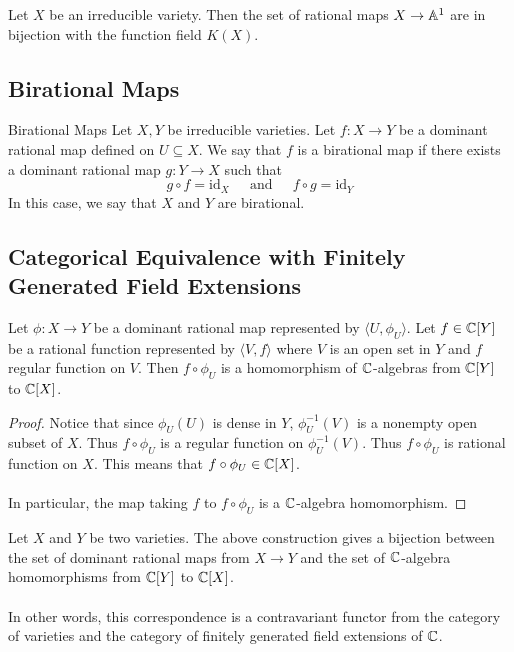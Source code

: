 \documentclass[a4paper]{article}
\begin{document}
\begin{prp}{}{} Let $X$ be an irreducible variety. Then the set of rational maps $X\to\mathbb{A}^1$ are in bijection with the function field $K(X)$. 
\end{prp}

\subsection{Birational Maps}
\begin{defn}{Birational Maps}{} Let $X,Y$ be irreducible varieties. Let $f:X\to Y$ be a dominant rational map defined on $U\subseteq X$. We say that $f$ is a birational map if there exists a dominant rational map $g:Y\to X$ such that $$g\circ f=\text{id}_X\;\;\;\;\text{ and }\;\;\;\;f\circ g=\text{id}_Y$$ In this case, we say that $X$ and $Y$ are birational. 
\end{defn}

\subsection{Categorical Equivalence with Finitely Generated Field Extensions}
\begin{prp}{}{} Let $\phi:X\to Y$ be a dominant rational map represented by $\langle U,\phi_U\rangle$. Let $f\in \mathbb{C}[Y]$ be a rational function represented by $\langle V,f\rangle$ where $V$ is an open set in $Y$ and $f$ regular function on $V$. Then $f\circ\phi_U$ is a homomorphism of $\mathbb{C}$-algebras from $\mathbb{C}[Y]$ to $\mathbb{C}[X]$. \tcbline
\begin{proof}
Notice that since $\phi_U(U)$ is dense in $Y$, $\phi_U^{-1}(V)$ is a nonempty open subset of $X$. Thus $f\circ\phi_U$ is a regular function on $\phi_U^{-1}(V)$. Thus $f\circ\phi_U$ is rational function on $X$. This means that $f\circ\phi_U\in\mathbb{C}[X]$. \\~\\
In particular, the map taking $f$ to $f\circ\phi_U$ is a $\mathbb{C}$-algebra homomorphism. 
\end{proof}
\end{prp}

\begin{thm}{}{} Let $X$ and $Y$ be two varieties. The above construction gives a bijection between the set of dominant rational maps from $X\to Y$ and the set of $\mathbb{C}$-algebra homomorphisms from $\mathbb{C}[Y]$ to $\mathbb{C}[X]$. \\~\\
In other words, this correspondence is a contravariant functor from the category of varieties and the category of finitely generated field extensions of $\mathbb{C}$. 
\end{thm}
\end{document}
